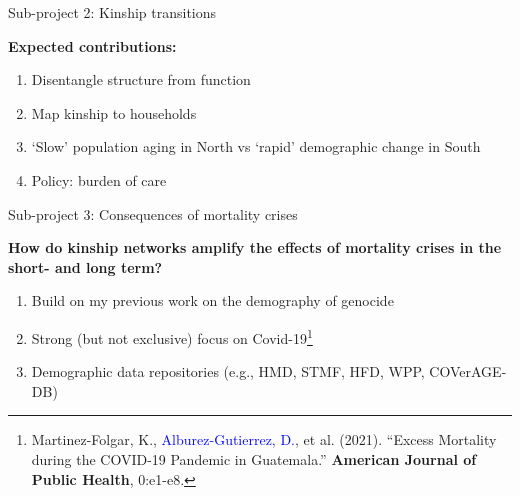 \begin{frame}{Sub-project 2: Kinship transitions}

\textbf{Expected contributions:} 
\vspace{0.5cm}

    \begin{enumerate}
         \item Disentangle structure from function
         \item Map kinship to households
         \item `Slow' population aging in North vs `rapid' demographic change in South
         \item Policy: burden of care
     \end{enumerate}
     
\end{frame}


\begin{frame}{Sub-project 3: Consequences of mortality crises}

\textbf{How do kinship networks amplify the effects of mortality crises in the short- and long term?} 
\vspace{0.5cm}

 \begin{enumerate}
     \item Build on my previous work on the demography of genocide 
     \item Strong (but not exclusive) focus on Covid-19\footnote{Martinez-Folgar, K., \textcolor{blue}{Alburez-Gutierrez, D.}, et al. (2021). ``Excess Mortality during the COVID-19 Pandemic in Guatemala.'' \textbf{American Journal of Public Health}, 0:e1-e8.}
     \item Demographic data repositories (e.g., HMD, STMF, HFD, WPP, COVerAGE-DB)

 \end{enumerate}
 
\end{frame}


